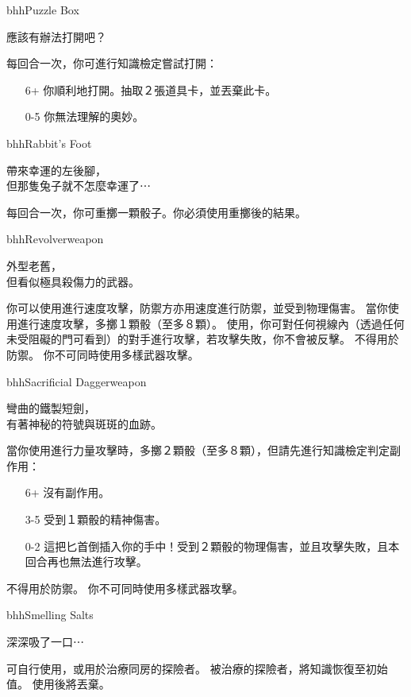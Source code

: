 \linebreak[0]%
\begin{ItemCard}{bhh}{Puzzle Box}{}
  \begin{CardStory}
    應該有辦法打開吧？
  \end{CardStory}
  每回合一次，你可進行知識檢定嘗試打開\ThisName{}：
  \begin{itemize}
    \item[6+] 你順利地打開\ThisName{}。抽取２張道具卡，並丟棄此卡。
    \item[0-5] 你無法理解\ThisName{}的奧妙。
  \end{itemize}
\end{ItemCard}%
\linebreak[0]%
\begin{ItemCard}{bhh}{Rabbit’s Foot}{}
  \begin{CardStory}
    帶來幸運的左後腳，\\
    但那隻兔子就不怎麼幸運了⋯
  \end{CardStory}
  每回合一次，你可重擲一顆骰子。你必須使用重擲後的結果。\smallbreak
\end{ItemCard}%
\linebreak[0]%
\begin{ItemCard}{bhh}{Revolver}{weapon}
  \begin{CardStory}
    外型老舊，\\
    但看似極具殺傷力的武器。
  \end{CardStory}
  你可以使用\ThisName{}進行速度攻擊，防禦方亦用速度進行防禦，並受到物理傷害。\smallbreak
  當你使用\ThisName{}進行速度攻擊，多擲１顆骰（至多８顆）。\smallbreak
  使用\ThisName{}，你可對任何視線內（透過任何未受阻礙的門可看到）的對手進行攻擊，若攻擊失敗，你不會被反擊。\smallbreak
  \ThisName{}不得用於防禦。\smallbreak
  你不可同時使用多樣武器攻擊。\smallbreak
\end{ItemCard}%
\linebreak[0]%
\begin{ItemCard}{bhh}{Sacrificial Dagger}{weapon}
  \begin{CardStory}
    彎曲的鐵製短劍，\\
    有著神秘的符號與斑斑的血跡。
  \end{CardStory}
  當你使用\ThisName{}進行力量攻擊時，多擲２顆骰（至多８顆），但請先進行知識檢定判定副作用：
  \begin{itemize}
    \item[6+] 沒有副作用。
    \item[3-5] 受到１顆骰的精神傷害。
    \item[0-2] 這把匕首倒插入你的手中！受到２顆骰的物理傷害，並且攻擊失敗，且本回合再也無法進行攻擊。
  \end{itemize}
  \ThisName{}不得用於防禦。\smallbreak
  你不可同時使用多樣武器攻擊。\smallbreak
\end{ItemCard}%
\linebreak[0]%
\begin{ItemCard}{bhh}{Smelling Salts}{}
  \begin{CardStory}
    深深吸了一口⋯
  \end{CardStory}
  可自行使用，或用於治療同房的探險者。\smallbreak
  被\ThisName{}治療的探險者，將知識恢復至初始值。\smallbreak
  使用後將\ThisName{}丟棄。\smallbreak
\end{ItemCard}%
\linebreak[0]%
